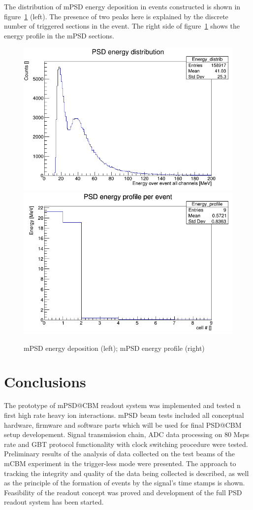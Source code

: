 \documentclass[a4paper,11pt]{article}
\begin{document}
The distribution of mPSD energy deposition in events constructed is shown in figure~\ref{fig:7} (left). The presence of two peaks here is explained by the discrete number of triggered sections in the event. The right side of figure~\ref{fig:7} shows the energy profile in the mPSD sections.

\begin{figure}[htbp]
\centering %
\includegraphics[width=.45\textwidth]{PsdEdepInEvent_calibrd.png}
\qquad
\includegraphics[width=.45\textwidth]{PsdEprofileInEvent_calibrd.png}
\caption{\label{fig:7} mPSD energy deposition (left); mPSD energy profile (right)}
\end{figure}

\section{Conclusions}
The prototype of mPSD@CBM readout system was implemented and tested n first high rate heavy ion interactions. mPSD beam tests included all conceptual hardware, firmware and software parts which will be used for final PSD@CBM setup developement. Signal transmission chain, ADC data processing on 80 Msps rate and GBT protocol functionality with clock switching procedure were tested. Preliminary results of the analysis of data collected on the test beams of the mCBM experiment in the trigger-less mode were presented. The approach to tracking the integrity and quality of the data being collected is described, as well as the principle of the formation of events by the signal's time stamps is shown.
Feasibility of the readout concept was proved and development of the full PSD readout system has been started.
\end{document}
